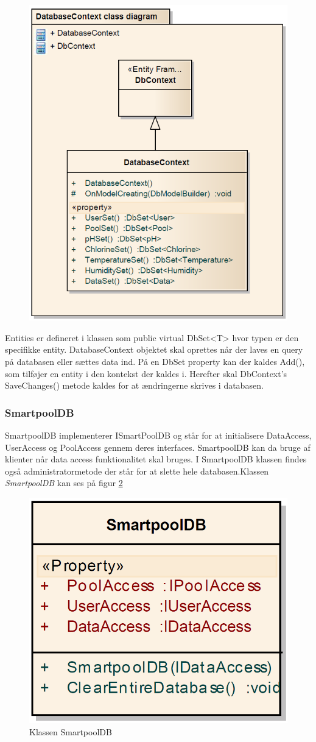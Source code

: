 \begin{figure}
\centering
\includegraphics[width=0.5\linewidth]{figs/implementering/dbContextClass.PNG}
\caption{}
\label{fig:dbContextClass}
\end{figure}

Entities er defineret i klassen som public virtual DbSet<T> hvor typen er den specifikke entity.
DatabaseContext objektet skal oprettes når der laves en query på databasen eller sættes data ind.
På en DbSet property kan der kaldes Add(), som tilføjer en entity i den kontekst der kaldes i. Herefter skal DbContext’s SaveChanges() metode kaldes for at ændringerne skrives i databasen.

\subsubsection{SmartpoolDB}
SmartpoolDB implementerer ISmartPoolDB og står for at initialisere DataAccess, UserAccess og PoolAccess gennem deres interfaces. SmartpoolDB kan da bruge af klienter når data access funktionalitet skal bruges. I SmartpoolDB klassen findes også administratormetode der står for at slette hele databasen.Klassen \textit{SmartpoolDB} kan ses på figur \ref{fig:smartpoolDBClass}

\begin{figure}
\centering
\includegraphics[width=0.5\linewidth]{figs/implementering/smartpoolDBClass.PNG}
\caption{Klassen SmartpoolDB}
\label{fig:smartpoolDBClass}
\end{figure}

